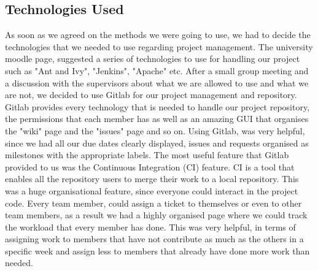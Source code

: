\documentclass{l3proj}
\begin{document}
\subsection{Technologies Used}
\label{tech}

As soon as we agreed on the methods we were going to use, we had to decide the technologies that we needed to use regarding project management. The university moodle page, suggested a series of technologies to use for handling our project such as "Ant and Ivy", "Jenkins", "Apache" etc. After a small group meeting and a discussion with the supervisors about what we are allowed to use and what we are not, we decided to use Gitlab for our project management and repository. Gitlab provides every technology that is needed to handle our project repository, the permissions that each member has as well as an amazing GUI that organises the "wiki" page and the "issues" page and so on. Using Gitlab, was very helpful, since we had all our due dates clearly displayed, issues and requests organised as milestones with the appropriate labels. The most useful feature that Gitlab provided to us was the Continuous Integration (CI) feature. CI is a tool that enables all the repository users to merge their work to a local repository. This was a huge organisational feature, since everyone could interact in the project code. Every team member, could assign a ticket to themselves or even to other team members, as a result we had a highly organised page where we could track the workload that every member has done. This was very helpful, in terms of assigning work to members that have not contribute as much as the others in a specific week and assign less to members that already have done more work than needed.
\end{document}
